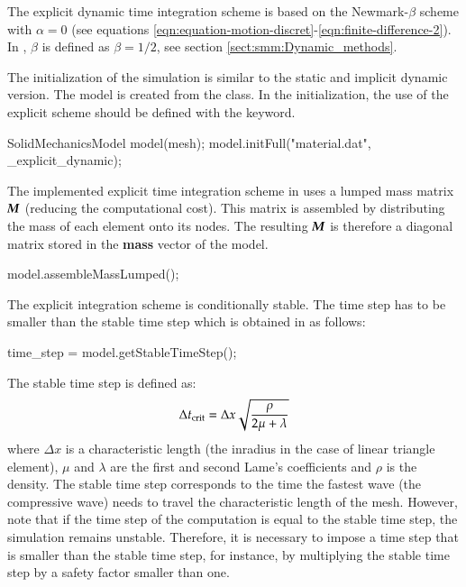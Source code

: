 The explicit  dynamic time  integration scheme is  based on  the Newmark-$\beta$
scheme            with            $\alpha=0$           (see            equations
\ref{eqn:equation-motion-discret}-\ref{eqn:finite-difference-2}).   In  \akantu,
$\beta$ is defined as $\beta=1/2$, see section \ref{sect:smm:Dynamic_methods}.

The  initialization of  the simulation  is similar  to the  static  and implicit
dynamic  version.   The model  is  created  from the  
class.   In the  initialization, the  use of  the explicit  scheme  should be
defined with the  keyword.

\begin{cpp}
  SolidMechanicsModel model(mesh);
  model.initFull("material.dat", _explicit_dynamic);
\end{cpp}


The implemented explicit  time integration scheme in \akantu  uses a lumped mass
matrix $\boldsymbol{M}$ (reducing the computational  cost). This matrix is assembled by
distributing the mass of each element onto its nodes. The resulting $\boldsymbol{M}$ is
therefore a diagonal matrix stored in the \textbf{mass} vector of the model.


\begin{cpp}
  model.assembleMassLumped();
\end{cpp}

The explicit integration scheme is conditionally stable. The time step has to be
smaller than the stable time step which is obtained in \akantu as follows:

\begin{cpp}
  time_step = model.getStableTimeStep();
\end{cpp}

The stable time step is defined as:
\begin{equation}\label{eqn:smm:explicit:stabletime}
  \Delta t_{{\mathrm{crit}}} = \Delta x \sqrt{\frac{\rho}{2 \mu + \lambda}}
\end{equation}
where $\Delta  x$ is a  characteristic length (\eg  the inradius in the  case of
linear triangle  element), $\mu$ and $\lambda$  are the first  and second Lame's
coefficients and $\rho$ is the density.  The stable time step corresponds to the
time the fastest wave (the  compressive wave) needs to travel the characteristic
length of the mesh.   However, note that if the time step  of the computation is
equal to the stable time step, the simulation remains unstable. Therefore, it is
necessary to impose a  time step that is smaller than the  stable time step, for
instance, by  multiplying the stable time  step by a safety  factor smaller than
one.

